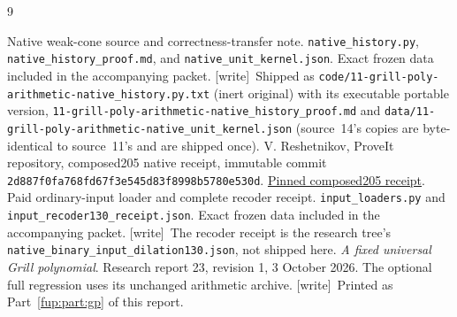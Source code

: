 \documentclass[11pt,letterpaper]{article}
\newcommand{\fupR}{0}
\renewcommand{\thesection}{\fupR.\arabic{section}}
\renewcommand{\theHsection}{\fupR.\arabic{section}}
\newcommand{\fupstart}[2]{%
  \renewcommand{\fupR}{#1}\setcounter{section}{0}\setcounter{equation}{0}%
  \renewcommand{\thesection}{\fupR.\arabic{section}}%
  \renewcommand{\theHsection}{\fupR.\arabic{section}}%
  \renewcommand{\fuphead}{#2}}
\newcommand{\fuphead}{Front matter}
\theoremstyle{definition}\newtheorem{definition}[theorem]{Definition}
\theoremstyle{remark}\newtheorem{remark}[theorem]{Remark}
\newcommand{\fnameB}[1]{{\small\nolinkurl{#1}}}
\newcommand{\wtag}{\textup{[write]}}
\newcommand{\rw}[1]{\nolinkurl{#1}}%
\begin{document}
\renewcommand{\refname}{References of Report 24}
\begin{thebibliography}{9}
\small\raggedright\setlength{\parskip}{0pt}\setlength{\itemsep}{1pt}
 Native weak-cone source and correctness-transfer note. \fnameB{native_history.py}, \fnameB{native_history_proof.md}, and \fnameB{native_unit_kernel.json}. Exact frozen data included in the accompanying packet. \wtag\ Shipped as \rw{code/11-grill-poly-arithmetic-native_history.py.txt} (inert original) with its executable portable version, \rw{11-grill-poly-arithmetic-native_history_proof.md} and \rw{data/11-grill-poly-arithmetic-native_unit_kernel.json} (source~14's copies are byte-identical to source~11's and are shipped once).
 V. Reshetnikov, ProveIt repository, composed205 native receipt, immutable commit \texttt{2d887f0fa768fd67f3e545d83f8998b5780e530d}. \href{https://github.com/VladimirReshetnikov/ProveIt/blob/2d887f0fa768fd67f3e545d83f8998b5780e530d/Computability/HilbertTenthProblem/Papers/research-wip/native-stream-queue/grill_tag_native_composed205.json}{Pinned composed205 receipt}.
 Paid ordinary-input loader and complete recoder receipt. \fnameB{input_loaders.py} and \fnameB{input_recoder130_receipt.json}. Exact frozen data included in the accompanying packet. \wtag\ The recoder receipt is the research tree's \rw{native_binary_input_dilation130.json}, not shipped here.
 \emph{A fixed universal Grill polynomial}. Research report 23, revision 1, 3 October 2026. The optional full regression uses its unchanged arithmetic archive. \wtag\ Printed as Part~\ref{fup:part:gp} of this report.
\end{thebibliography}

\clearpage
\fupstart{25}{Part III: Report 25}
\end{document}
